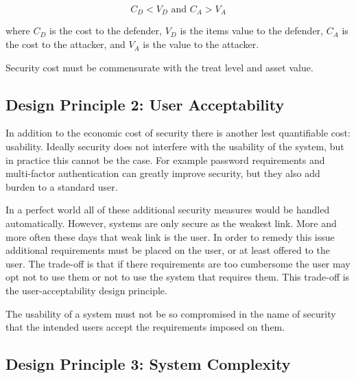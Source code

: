    \begin{equation}
      C_D < V_D \text{ and } C_A > V_A
    \end{equation}
    
    where $C_D$ is the cost to the defender, $V_D$ is the items value to the defender, $C_A$ is the
      cost to the attacker, and $V_A$ is the value to the attacker.

    \begin{keybox}
      Security cost must be commensurate with the treat level and asset value.
    \end{keybox}

  \subsection{Design Principle 2: User Acceptability}
  \label{ssec:design_principle_2_user_Acceptability}

    In addition to the economic cost of security there is another lest quantifiable cost: usability.
    Ideally security does not interfere with the usability of the system, but in practice this cannot be 
      the case.
    For example password requirements and multi-factor authentication can greatly improve security,
      but they also add burden to a standard user.

    In a perfect world all of these additional security measures would be handled automatically.
    However, systems are only secure as the weakest link.
    More and more often these days that weak link is the user.
    In order to remedy this issue additional requirements must be placed on the user, or at least
      offered to the user.
    The trade-off is that if there requirements are too cumbersome the user may opt not to use them
      or not to use the system that requires them. 
    This trade-off is the user-acceptability design principle.

    \begin{keybox}
      The usability of a system must not be so compromised in the name of security that
        the intended users accept the requirements imposed on them.
    \end{keybox}

  \subsection{Design Principle 3: System Complexity}
  \label{ssec:design_principle_3_system_complexity}

